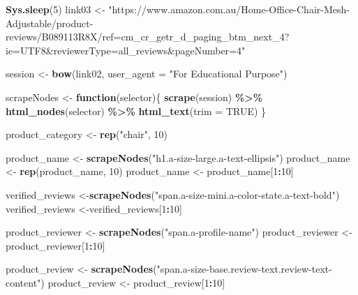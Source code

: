 \documentclass[
]{article}
\newenvironment{Shaded}{\begin{snugshade}}{\end{snugshade}}
\newcommand{\AttributeTok}[1]{\textcolor[rgb]{0.13,0.29,0.53}{#1}}
\newcommand{\ConstantTok}[1]{\textcolor[rgb]{0.56,0.35,0.01}{#1}}
\newcommand{\ControlFlowTok}[1]{\textcolor[rgb]{0.13,0.29,0.53}{\textbf{#1}}}
\newcommand{\DecValTok}[1]{\textcolor[rgb]{0.00,0.00,0.81}{#1}}
\newcommand{\FunctionTok}[1]{\textcolor[rgb]{0.13,0.29,0.53}{\textbf{#1}}}
\newcommand{\NormalTok}[1]{#1}
\newcommand{\OtherTok}[1]{\textcolor[rgb]{0.56,0.35,0.01}{#1}}
\newcommand{\SpecialCharTok}[1]{\textcolor[rgb]{0.81,0.36,0.00}{\textbf{#1}}}
\newcommand{\StringTok}[1]{\textcolor[rgb]{0.31,0.60,0.02}{#1}}
\begin{document}
\begin{Shaded}
\begin{Highlighting}[]
   \FunctionTok{Sys.sleep}\NormalTok{(}\DecValTok{5}\NormalTok{)}
\NormalTok{link03 }\OtherTok{\textless{}{-}} \StringTok{"https://www.amazon.com.au/Home{-}Office{-}Chair{-}Mesh{-}Adjustable/product{-}reviews/B089113R8X/ref=cm\_cr\_getr\_d\_paging\_btm\_next\_4?ie=UTF8\&reviewerType=all\_reviews\&pageNumber=4"}


\NormalTok{  session }\OtherTok{\textless{}{-}} \FunctionTok{bow}\NormalTok{(link02,}
               \AttributeTok{user\_agent =} \StringTok{"For Educational Purpose"}\NormalTok{)}

\NormalTok{  scrapeNodes }\OtherTok{\textless{}{-}} \ControlFlowTok{function}\NormalTok{(selector)\{}
    \FunctionTok{scrape}\NormalTok{(session) }\SpecialCharTok{\%\textgreater{}\%}
      \FunctionTok{html\_nodes}\NormalTok{(selector) }\SpecialCharTok{\%\textgreater{}\%}
      \FunctionTok{html\_text}\NormalTok{(}\AttributeTok{trim =} \ConstantTok{TRUE}\NormalTok{)}
\NormalTok{  \}}

\NormalTok{  product\_category }\OtherTok{\textless{}{-}} \FunctionTok{rep}\NormalTok{(}\StringTok{"chair"}\NormalTok{, }\DecValTok{10}\NormalTok{)}

\NormalTok{  product\_name }\OtherTok{\textless{}{-}} \FunctionTok{scrapeNodes}\NormalTok{(}\StringTok{"h1.a{-}size{-}large.a{-}text{-}ellipsis"}\NormalTok{)}
\NormalTok{  product\_name }\OtherTok{\textless{}{-}} \FunctionTok{rep}\NormalTok{(product\_name, }\DecValTok{10}\NormalTok{)}
\NormalTok{  product\_name }\OtherTok{\textless{}{-}}\NormalTok{ product\_name[}\DecValTok{1}\SpecialCharTok{:}\DecValTok{10}\NormalTok{]}
  
\NormalTok{  verified\_reviews }\OtherTok{\textless{}{-}}\FunctionTok{scrapeNodes}\NormalTok{(}\StringTok{"span.a{-}size{-}mini.a{-}color{-}state.a{-}text{-}bold"}\NormalTok{)}
\NormalTok{  verified\_reviews }\OtherTok{\textless{}{-}}\NormalTok{verified\_reviews[}\DecValTok{1}\SpecialCharTok{:}\DecValTok{10}\NormalTok{]}
  
\NormalTok{  product\_reviewer }\OtherTok{\textless{}{-}} \FunctionTok{scrapeNodes}\NormalTok{(}\StringTok{"span.a{-}profile{-}name"}\NormalTok{)}
\NormalTok{  product\_reviewer }\OtherTok{\textless{}{-}}\NormalTok{ product\_reviewer[}\DecValTok{1}\SpecialCharTok{:}\DecValTok{10}\NormalTok{]}
  
\NormalTok{  product\_review }\OtherTok{\textless{}{-}} \FunctionTok{scrapeNodes}\NormalTok{(}\StringTok{"span.a{-}size{-}base.review{-}text.review{-}text{-}content"}\NormalTok{)}
\NormalTok{  product\_review }\OtherTok{\textless{}{-}}\NormalTok{ product\_review[}\DecValTok{1}\SpecialCharTok{:}\DecValTok{10}\NormalTok{]}
  

\end{Highlighting}
\end{Shaded}
\end{document}
